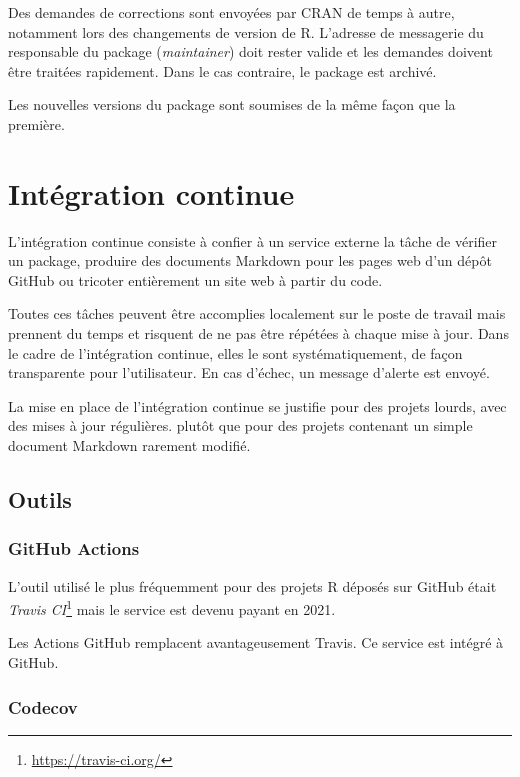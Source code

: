 \documentclass[
  11pt,
  french,
  a4paper,
  extrafontsizes,onecolumn,openright
  ]{memoir}
\begin{document}
Des demandes de corrections sont envoyées par CRAN de temps à autre, notamment lors des changements de version de R.
L'adresse de messagerie du responsable du package (\emph{maintainer}) doit rester valide et les demandes doivent être traitées rapidement.
Dans le cas contraire, le package est archivé.

Les nouvelles versions du package sont soumises de la même façon que la première.

\hypertarget{chap:ci}{%
\chapter{Intégration continue}\label{chap:ci}}

L'intégration continue consiste à confier à un service externe la tâche de vérifier un package, produire des documents Markdown pour les pages web d'un dépôt GitHub ou tricoter entièrement un site web à partir du code.

Toutes ces tâches peuvent être accomplies localement sur le poste de travail mais prennent du temps et risquent de ne pas être répétées à chaque mise à jour.
Dans le cadre de l'intégration continue, elles le sont systématiquement, de façon transparente pour l'utilisateur.
En cas d'échec, un message d'alerte est envoyé.

La mise en place de l'intégration continue se justifie pour des projets lourds, avec des mises à jour régulières.
plutôt que pour des projets contenant un simple document Markdown rarement modifié.

\hypertarget{outils}{%
\section{Outils}\label{outils}}

\hypertarget{github-actions}{%
\subsection{GitHub Actions}\label{github-actions}}

L'outil utilisé le plus fréquemment pour des projets R déposés sur GitHub était \emph{Travis CI}\footnote{\url{https://travis-ci.org/}} mais le service est devenu payant en 2021.

Les Actions GitHub remplacent avantageusement Travis.
Ce service est intégré à GitHub.

\hypertarget{codecov}{%
\subsection{Codecov}\label{codecov}}
\end{document}
